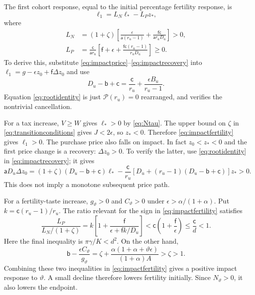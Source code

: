 \documentclass[11pt]{article}
\newcommand{\tht}{\vartheta}
\begin{document}
The first cohort response, equal to the initial percentage fertility response, is
\begin{equation}
 \ell_1=L_N\ell_*-L_Pz_*,\label{eq:impactfertility}
\end{equation}
where
\begin{align}
 L_N&=(1+\zeta)\left[\frac\epsilon{\mathsf a(r_u-1)}
               +\frac{\mathsf f\mathsf c}{\mathsf a r_uD_u}\right]>0,\nonumber\\
 L_P&=\frac{\mathsf c}{\mathsf a r_u}
 \left[\mathsf f+\epsilon+
       \frac{\mathsf f\mathsf c(r_u-1)}{r_uD_u}\right]\ge0.\label{eq:impactcoeff}
\end{align}
To derive this, substitute \eqref{eq:impactprice}--\eqref{eq:impactrecovery} into
$\ell_1=g-\epsilon z_0+\mathsf f\Delta z_0$ and use
\begin{equation}
 D_u-\mathsf b+\mathsf c
 =\frac{\mathsf c}{r_u}+\frac{\epsilon B_u}{r_u-1}.\label{eq:rootidentity}
\end{equation}
Equation \eqref{eq:rootidentity} is just $\mathcal P(r_u)=0$ rearranged, and verifies the nontrivial cancellation.

For a tax increase, $V\ge W$ gives $\ell_*>0$ by \eqref{eq:Ntau}. The upper bound on $\zeta$ in \eqref{eq:transitionconditions} gives $J<2\epsilon$, so $z_*<0$. Therefore \eqref{eq:impactfertility} gives $\ell_1>0$. The purchase price also falls on impact. In fact $z_0<z_*<0$ and the first price change is a recovery: $\Delta z_0>0$. To verify the latter, use \eqref{eq:rootidentity} in \eqref{eq:impactrecovery}; it gives
\[
 \mathsf aD_u\Delta z_0
 =(1+\zeta)(D_u-\mathsf b+\mathsf c)\ell_*
 -\frac{\mathsf c}{r_u}
   [D_u+(r_u-1)(D_u-\mathsf b+\mathsf c)]z_*>0.
\]
This does not imply a monotone subsequent price path.

For a fertility-taste increase, $g_{\tht}>0$ and $C_{\tht}>0$ under
$\epsilon>\alpha/(1+\alpha)$. Put $k=\mathsf c(r_u-1)/r_u$. The ratio relevant for the sign in \eqref{eq:impactfertility} satisfies
\[
 \frac{L_P}{L_N/(1+\zeta)}
 =k\left[1+\frac{\mathsf f}{\epsilon+\mathsf f k/D_u}\right]
 <\mathsf c\left(1+\frac{\mathsf f}\epsilon\right)
 \le\frac{\mathsf c}{d}<1.
\]
Here the final inequality is $\pi\gamma/K<d^2$. On the other hand,
\[
 \mathsf b-\frac{\epsilon C_{\tht}}{g_{\tht}}
 =\zeta+\frac{\alpha(1+\alpha+\tht\epsilon)}{(1+\alpha)A}>\zeta>1.
\]
Combining these two inequalities in \eqref{eq:impactfertility} gives a positive impact response to $\tht$. A small decline therefore lowers fertility initially. Since $N_{\tht}>0$, it also lowers the endpoint.
\end{document}
